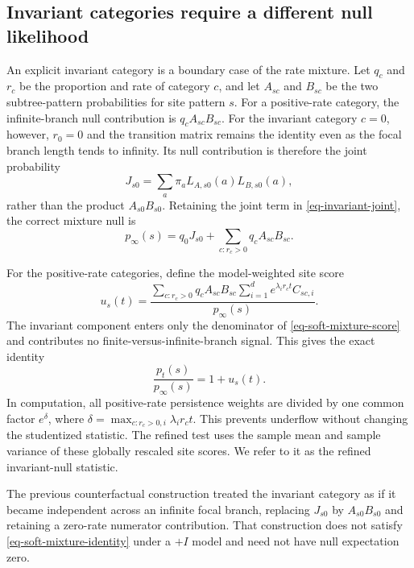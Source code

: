 \subsection*{Invariant categories require a different null likelihood}

An explicit invariant category is a boundary case of the rate mixture. Let \(q_c\) and \(r_c\) be the proportion and rate of category \(c\), and let \(A_{sc}\) and \(B_{sc}\) be the two subtree-pattern probabilities for site pattern \(s\). For a positive-rate category, the infinite-branch null contribution is \(q_cA_{sc}B_{sc}\). For the invariant category \(c=0\), however, \(r_0=0\) and the transition matrix remains the identity even as the focal branch length tends to infinity. Its null contribution is therefore the joint probability
\begin{equation}
J_{s0}
=
\sum_a \pi_a L_{A,s0}(a)L_{B,s0}(a),
\label{eq-invariant-joint}
\end{equation}
rather than the product \(A_{s0}B_{s0}\). Retaining the joint term in \cref{eq-invariant-joint}, the correct mixture null is
\begin{equation}
p_\infty(s)
=
q_0J_{s0}
+
\sum_{c:r_c>0}q_cA_{sc}B_{sc}.
\label{eq-invariant-null}
\end{equation}

For the positive-rate categories, define the model-weighted site score
\begin{equation}
u_s(t)
=
\frac{
\displaystyle
\sum_{c:r_c>0}q_cA_{sc}B_{sc}
\sum_{i=1}^{d}e^{\lambda_i r_ct}C_{sc,i}
}{p_\infty(s)}.
\label{eq-soft-mixture-score}
\end{equation}
The invariant component enters only the denominator of \cref{eq-soft-mixture-score} and contributes no finite-versus-infinite-branch signal. This gives the exact identity
\begin{equation}
\frac{p_t(s)}{p_\infty(s)}=1+u_s(t).
\label{eq-soft-mixture-identity}
\end{equation}
In computation, all positive-rate persistence weights are divided by one common factor \(e^\delta\), where \(\delta=\max_{c:r_c>0,i}\lambda_i r_ct\). This prevents underflow without changing the studentized statistic. The refined test uses the sample mean and sample variance of these globally rescaled site scores. We refer to it as the refined invariant-null statistic.

The previous counterfactual construction treated the invariant category as if it became independent across an infinite focal branch, replacing \(J_{s0}\) by \(A_{s0}B_{s0}\) and retaining a zero-rate numerator contribution. That construction does not satisfy \cref{eq-soft-mixture-identity} under a \(+I\) model and need not have null expectation zero.

